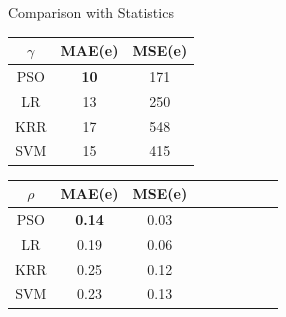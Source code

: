 \documentclass[hyperref={pdfpagelabels=false}, aspectratio=43, t]{beamer}  %
\begin{document}

\begin{frame}{Comparison with Statistics}
\begin{table}[htb]
	\centering
	\begin{tabular}{c cc }
    \hline\hline
        $\gamma$&  MAE(e)&   MSE(e)\\
    \hline
		PSO&   \textbf{10}& 171\\
        LR&    13& 250\\
        KRR &17 &548 \\
        SVM& 15&  415\\
    \hline\hline
	\end{tabular}
	\pause
	\begin{tabular}{c cc cc cc cc}
    \hline\hline
        $\rho$&  MAE(e)&   MSE(e)\\
    \hline
		PSO&   \textbf{0.14}&   0.03\\
        LR&    0.19&   0.06\\
        KRR &0.25 &0.12 \\
        SVM &0.23 &0.13 \\
    \hline\hline
	\end{tabular}
	\label{tab:post-emma}
\end{table}
\end{frame}
    
\end{document}
